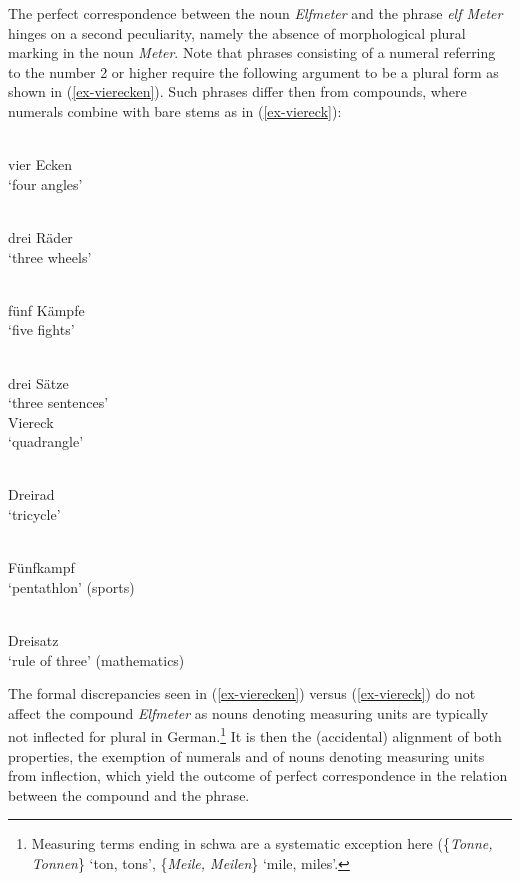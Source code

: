 \documentclass[output=paper
 ,nobabel
 ,draftmode
 ,colorlinks, citecolor=brown
]{langscibook}
\begin{document}
The perfect correspondence between the noun \emph{Elfmeter} and the phrase \emph{elf Meter} hinges on a second peculiarity, namely the absence of morphological plural marking in the noun \emph{Meter}. Note that phrases consisting of a numeral referring to the number 2 or higher require the following argument to be a plural form as shown in (\ref{ex-vierecken}). Such phrases differ then from compounds, where numerals combine with bare stems as in (\ref{ex-viereck}):

\begin{multicols}{2}
\ea\label{ex-vierecken}
\ea {[ˌfiʀˈɛkən]}\\
vier Ecken\\
`four angles'

\ex {[ˌdʀaiˈʀædəʀ]}\\
drei Räder\\
`three wheels'

\\
fünf Kämpfe\\
`five fights'

\\
drei Sätze\\
`three sentences'
\z
%
\columnbreak
%
\ex\label{ex-viereck}
\ea {[ˈfiʀˌɛk]}\\
Viereck\\
`quadrangle'

\ex {[ˈdʀaiˌʀɑd]}\\
Dreirad\\
`tricycle'

\\
Fünfkampf\\
`pentathlon' (sports)

\\
Dreisatz\\
`rule of three' (mathematics)
\z
\z
\end{multicols}

\noindent
The formal discrepancies seen in (\ref{ex-vierecken}) versus (\ref{ex-viereck}) do not affect the
compound \emph{Elfmeter} as nouns denoting measuring units are typically not inflected for plural in
German.\footnote{Measuring terms ending in schwa are a systematic exception here (\eg \{\emph{Tonne,
    Tonnen}\} `ton, tons', \{\emph{Meile, Meilen}\} `mile, miles'.} It is then the (accidental)
alignment of both properties, the exemption of numerals and of nouns denoting measuring units from
inflection, which yield the outcome of perfect correspondence in the relation between the compound
and the phrase. 
\end{document}
